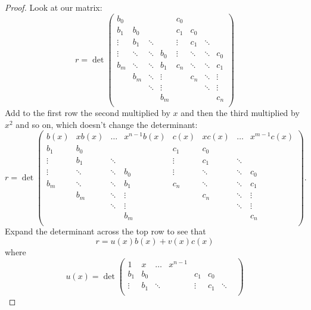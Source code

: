 \begin{proof}
Look at our matrix:
\[
r
=
\det
\begin{pmatrix}
b_0    &        &        &        & c_0 \\
b_1    & b_0    &        &        & c_1    & c_0 \\
\vdots & b_1    & \ddots &        & \vdots & c_1 & \ddots & \\
\vdots & \ddots & \ddots  & b_0   & \vdots & \ddots & \ddots & c_0 \\
b_m    & \ddots & \ddots  & b_1   & c_n    & \ddots & \ddots & c_1 \\
       & b_m    & \ddots & \vdots &        & c_n    & \ddots & \vdots \\
       &        & \ddots & \vdots    &        &        & \ddots & \vdots \\
       &        &        & b_m    &        &        &        & c_n \\
\end{pmatrix}
\]
Add to the first row the second multiplied by \(x\) and then the third multiplied by \(x^2\) and so on, which doesn't change the determinant:
\[
r
=
\det
\begin{pmatrix}
b(x)   & xb(x)  & \dots  & x^{n-1}b(x) & c(x) & xc(x) & \dots & x^{m-1}c(x) \\
b_1    & b_0    &        &        & c_1    & c_0 \\
\vdots & b_1    & \ddots &        & \vdots & c_1 & \ddots & \\
\vdots & \ddots & \ddots & b_0   & \vdots & \ddots & \ddots & c_0 \\
b_m    & \ddots & \ddots & b_1   & c_n    & \ddots & \ddots & c_1 \\
       & b_m    & \ddots & \vdots &        & c_n    & \ddots & \vdots \\
       &        & \ddots & \vdots    &        &        & \ddots & \vdots \\
       &        &        & b_m    &        &        &        & c_n \\
\end{pmatrix}.
\]
Expand the determinant across the top row to see that
\[
r=u(x)b(x)+v(x)c(x)
\]
where
\[
u(x)
=
\det
\begin{pmatrix}
1      & x      & \dots  & x^{n-1} \\
b_1    & b_0    &        &         & c_1    & c_0 \\
\vdots & b_1    & \ddots &        & \vdots & c_1 & \ddots & \\

\end{pmatrix}\]
\end{proof}
